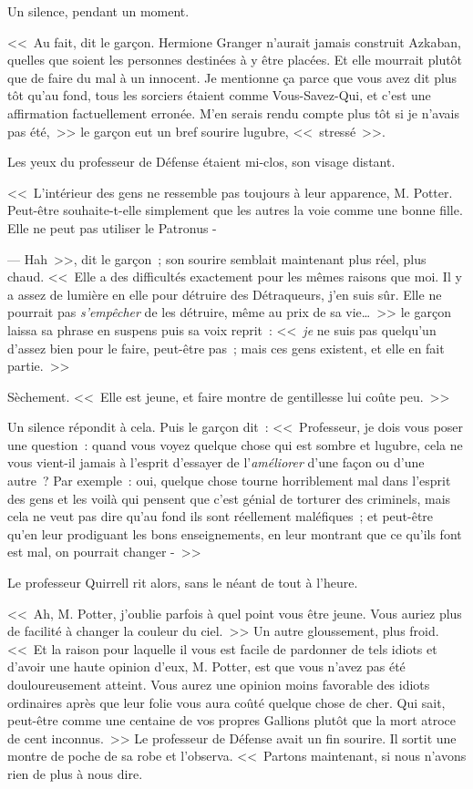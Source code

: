 Un silence, pendant un moment.

<<~Au fait, dit le garçon. Hermione Granger n'aurait jamais construit Azkaban, quelles que soient les personnes destinées à y être placées. Et elle mourrait plutôt que de faire du mal à un innocent. Je mentionne ça parce que vous avez dit plus tôt qu'au fond, tous les sorciers étaient comme Vous-Savez-Qui, et c'est une affirmation factuellement erronée. M'en serais rendu compte plus tôt si je n'avais pas été,~>> le garçon eut un bref sourire lugubre, <<~stressé~>>.

Les yeux du professeur de Défense étaient mi-clos, son visage distant.

<<~L'intérieur des gens ne ressemble pas toujours à leur apparence, M. Potter. Peut-être souhaite-t-elle simplement que les autres la voie comme une bonne fille. Elle ne peut pas utiliser le Patronus -

--- Hah~>>, dit le garçon~; son sourire semblait maintenant plus réel, plus chaud. <<~Elle a des difficultés exactement pour les mêmes raisons que moi. Il y a assez de lumière en elle pour détruire des Détraqueurs, j'en suis sûr. Elle ne pourrait pas \emph{s'empêcher} de les détruire, même au prix de sa vie…~>> le garçon laissa sa phrase en suspens puis sa voix reprit~: <<~\emph{je} ne suis pas quelqu'un d'assez bien pour le faire, peut-être pas~; mais ces gens existent, et elle en fait partie.~>>

Sèchement. <<~Elle est jeune, et faire montre de gentillesse lui coûte peu.~>>

Un silence répondit à cela. Puis le garçon dit~: <<~Professeur, je dois vous poser une question~: quand vous voyez quelque chose qui est sombre et lugubre, cela ne vous vient-il jamais à l'esprit d'essayer de l'\emph{améliorer} d'une façon ou d'une autre~? Par exemple~: oui, quelque chose tourne horriblement mal dans l'esprit des gens et les voilà qui pensent que c'est génial de torturer des criminels, mais cela ne veut pas dire qu'au fond ils sont réellement maléfiques~; et peut-être qu'en leur prodiguant les bons enseignements, en leur montrant que ce qu'ils font est mal, on pourrait changer -~>>

Le professeur Quirrell rit alors, sans le néant de tout à l'heure.

<<~Ah, M. Potter, j'oublie parfois à quel point vous être jeune. Vous auriez plus de facilité à changer la couleur du ciel.~>> Un autre gloussement, plus froid. <<~Et la raison pour laquelle il vous est facile de pardonner de tels idiots et d'avoir une haute opinion d'eux, M. Potter, est que vous n'avez pas été douloureusement atteint. Vous aurez une opinion moins favorable des idiots ordinaires après que leur folie vous aura coûté quelque chose de cher. Qui sait, peut-être comme une centaine de vos propres Gallions plutôt que la mort atroce de cent inconnus.~>> Le professeur de Défense avait un fin sourire. Il sortit une montre de poche de sa robe et l'observa. <<~Partons maintenant, si nous n'avons rien de plus à nous dire.


